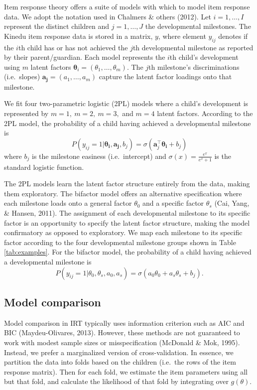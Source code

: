 \documentclass[10pt, letterpaper]{article}
\begin{document}
Item response theory offers a suite of models with which to model item
response data. We adopt the notation used in Chalmers \& others (2012).
Let \(i = 1, \ldots, I\) represent the distinct children and
\(j = 1, \ldots, J\) the developmental milestones. The Kinedu item
response data is stored in a matrix, \(y\), where element \(y_{ij}\)
denotes if the \(i\)th child has or has not achieved the \(j\)th
developmental milestone as reported by their parent/guardian. Each model
represents the \(i\)th child's development using \(m\) latent factors
\(\boldsymbol{\theta}_{i}=(\theta_1, \ldots, \theta_m)\). The \(j\)th
milestone's discriminations (i.e.~slopes)
\(\boldsymbol{a_j}=(a_1, \dots, a_m)\) capture the latent factor
loadings onto that milestone.

We fit four two-parametric logistic (2PL) models where a child's
development is represented by \(m = 1, \ m = 2, \ m = 3,\) and \(m = 4\)
latent factors. According to the 2PL model, the probability of a child
having achieved a developmental milestone is \[
P(y_{ij} = 1 | \boldsymbol{\theta_i}, \boldsymbol{a_j}, b_j) = \sigma(\boldsymbol{a}_{j}^{\top}\boldsymbol{\theta_i} + b_j)
\] where \(b_j\) is the milestone easiness (i.e.~intercept) and
\(\sigma(x) = \frac{e^x}{e^x + 1}\) is the standard logistic function.

The 2PL models learn the latent factor structure entirely from the data,
making them exploratory. The bifactor model offers an alternative
specification where each milestone loads onto a general factor
\(\theta_0\) and a specific factor \(\theta_s\) (Cai, Yang, \& Hansen,
2011). The assignment of each developmental milestone to its specific
factor is an opportunity to specify the latent factor structure, making
the model confirmatory as opposed to exploratory. We map each milestone
to its specific factor according to the four developmental milestone
groups shown in Table \ref{tab:examples}. For the bifactor model, the
probability of a child having achieved a developmental milestone is \[
P(y_{ij} = 1 | \theta_0, \theta_s, a_0, a_s) = \sigma(a_0\theta_0 + a_s\theta_s + b_j).
\]

\hypertarget{model-comparison}{%
\subsection{Model comparison}\label{model-comparison}}

Model comparison in IRT typically uses information criterion such as AIC
and BIC (Maydeu-Olivares, 2013). However, these methods are not
guaranteed to work with modest sample sizes or misspecification
(McDonald \& Mok, 1995). Instead, we prefer a marginalized version of
cross-validation. In essence, we partition the data into folds based on
the children (i.e.~the rows of the item response matrix). Then for each
fold, we estimate the item parameters using all but that fold, and
calculate the likelihood of that fold by integrating over \(g(\theta)\).
\end{document}
